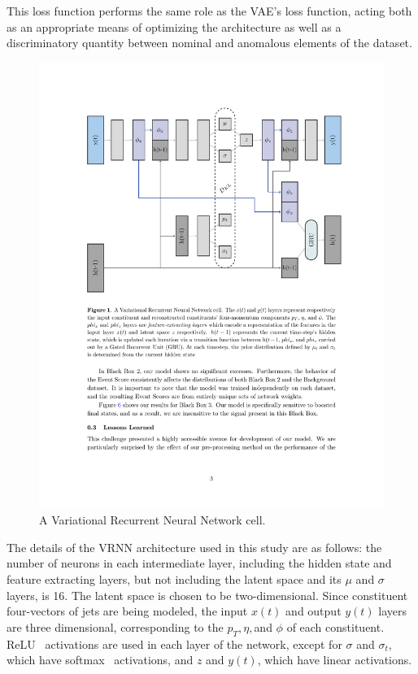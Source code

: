 \documentclass[11pt, a4paper]{article}
\begin{document}
This loss function performs the same role as the VAE's loss function, acting both as an appropriate means of optimizing the architecture as well as a discriminatory quantity between nominal and anomalous elements of the dataset.

\begin{figure}[H]
	\begin{center}
		\includegraphics[width=420pt]{imgs/VRNN_Diagram.pdf}
	\end{center}
	\caption{A Variational Recurrent Neural Network cell.}
	\label{fig:VRNN}
\end{figure}



The details of the VRNN architecture used in this study are as follows: the number of neurons in each intermediate layer, including the hidden state and feature extracting layers, but not including the latent space and its $\mu$ and $\sigma$ layers, is 16. The latent space is chosen to be two-dimensional. Since constituent four-vectors of jets are being modeled, the input $x(t)$ and output $y(t)$ layers are three dimensional, corresponding to the $p_{T}, \eta, $and $\phi$ of each constituent. ReLU~\cite{activations} activations are used in each layer of the network, except for $\sigma$ and $\sigma_{t}$, which have softmax~\cite{activations} activations, and $z$ and $y(t)$, which have linear activations. 
\end{document}
